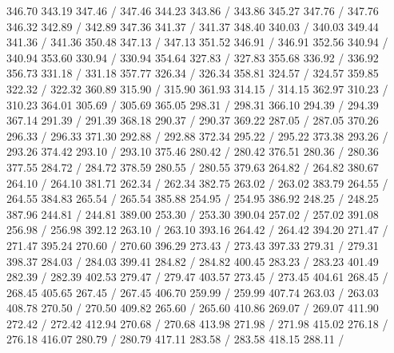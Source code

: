 { 346.70 343.19 347.46 /
 347.46 344.23 343.86 /
 343.86 345.27 347.76 /
 347.76 346.32 342.89 /
 342.89 347.36 341.37 /
 341.37 348.40 340.03 /
 340.03 349.44 341.36 /
 341.36 350.48 347.13 /
 347.13 351.52 346.91 /
 346.91 352.56 340.94 /
 340.94 353.60 330.94 /
 330.94 354.64 327.83 /
 327.83 355.68 336.92 /
 336.92 356.73 331.18 /
 331.18 357.77 326.34 /
 326.34 358.81 324.57 /
 324.57 359.85 322.32 /
 322.32 360.89 315.90 /
 315.90 361.93 314.15 /
 314.15 362.97 310.23 /
 310.23 364.01 305.69 /
 305.69 365.05 298.31 /
 298.31 366.10 294.39 /
 294.39 367.14 291.39 /
 291.39 368.18 290.37 /
 290.37 369.22 287.05 /
 287.05 370.26 296.33 /
 296.33 371.30 292.88 /
 292.88 372.34 295.22 /
 295.22 373.38 293.26 /
 293.26 374.42 293.10 /
 293.10 375.46 280.42 /
 280.42 376.51 280.36 /
 280.36 377.55 284.72 /
 284.72 378.59 280.55 /
 280.55 379.63 264.82 /
 264.82 380.67 264.10 /
 264.10 381.71 262.34 /
 262.34 382.75 263.02 /
 263.02 383.79 264.55 /
 264.55 384.83 265.54 /
 265.54 385.88 254.95 /
 254.95 386.92 248.25 /
 248.25 387.96 244.81 /
 244.81 389.00 253.30 /
 253.30 390.04 257.02 /
 257.02 391.08 256.98 /
 256.98 392.12 263.10 /
 263.10 393.16 264.42 /
 264.42 394.20 271.47 /
 271.47 395.24 270.60 /
 270.60 396.29 273.43 /
 273.43 397.33 279.31 /
 279.31 398.37 284.03 /
 284.03 399.41 284.82 /
 284.82 400.45 283.23 /
 283.23 401.49 282.39 /
 282.39 402.53 279.47 /
 279.47 403.57 273.45 /
 273.45 404.61 268.45 /
 268.45 405.65 267.45 /
 267.45 406.70 259.99 /
 259.99 407.74 263.03 /
 263.03 408.78 270.50 /
 270.50 409.82 265.60 /
 265.60 410.86 269.07 /
 269.07 411.90 272.42 /
 272.42 412.94 270.68 /
 270.68 413.98 271.98 /
 271.98 415.02 276.18 /
 276.18 416.07 280.79 /
 280.79 417.11 283.58 /
 283.58 418.15 288.11 /
}
